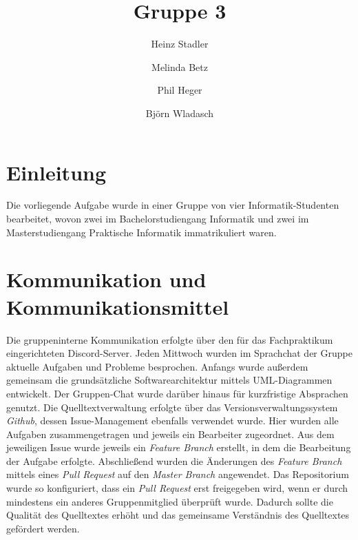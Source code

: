 \documentclass[runningheads]{llncs}
\begin{document}
	\title{Gruppe 3}
	\author{Heinz Stadler\and
		Melinda Betz\and
		Phil Heger\and
		Björn Wladasch}
	\maketitle              %
	\section{Einleitung}
	Die vorliegende Aufgabe wurde in einer Gruppe von vier Informatik-Studenten bearbeitet, wovon zwei im Bachelorstudiengang Informatik und zwei im Masterstudiengang Praktische Informatik immatrikuliert waren.
	
	\section{Kommunikation und Kommunikationsmittel}
	Die gruppeninterne Kommunikation erfolgte über den für das Fachpraktikum eingerichteten Discord-Server. Jeden Mittwoch wurden im Sprachchat der Gruppe aktuelle Aufgaben und Probleme besprochen. Anfangs wurde außerdem gemeinsam die grundsätzliche Softwarearchitektur mittels UML-Diagrammen entwickelt. Der Gruppen-Chat wurde darüber hinaus für kurzfristige Absprachen genutzt.
	Die Quelltextverwaltung erfolgte über das Versionsverwaltungssystem \textit{Github}, dessen Issue-Management ebenfalls verwendet wurde. Hier wurden alle Aufgaben zusammengetragen und jeweils ein Bearbeiter zugeordnet. Aus dem jeweiligen Issue wurde jeweils ein \textit{Feature Branch} erstellt, in dem die Bearbeitung der Aufgabe erfolgte. Abschließend wurden die Änderungen des \textit{Feature Branch} mittels eines \textit{Pull Request} auf den \textit{Master Branch} angewendet. Das Repositorium wurde so konfiguriert, dass ein \textit{Pull Request} erst freigegeben wird, wenn er durch mindestens ein anderes Gruppenmitglied überprüft wurde. Dadurch sollte die Qualität des Quelltextes erhöht und das gemeinsame Verständnis des Quelltextes gefördert werden.
	
\end{document}
